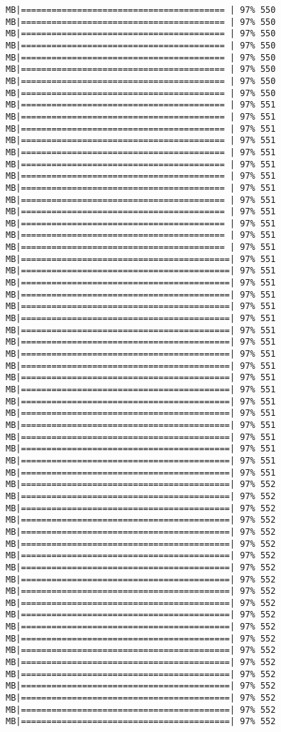 \documentclass[
]{article}
\begin{document}
\begin{verbatim}
MB|======================================== | 97% 550 MB|======================================== | 97% 550 MB|======================================== | 97% 550 MB|======================================== | 97% 550 MB|======================================== | 97% 550 MB|======================================== | 97% 550 MB|======================================== | 97% 550 MB|======================================== | 97% 550 MB|======================================== | 97% 551 MB|======================================== | 97% 551 MB|======================================== | 97% 551 MB|======================================== | 97% 551 MB|======================================== | 97% 551 MB|======================================== | 97% 551 MB|======================================== | 97% 551 MB|======================================== | 97% 551 MB|======================================== | 97% 551 MB|======================================== | 97% 551 MB|======================================== | 97% 551 MB|======================================== | 97% 551 MB|======================================== | 97% 551 MB|=========================================| 97% 551 MB|=========================================| 97% 551 MB|=========================================| 97% 551 MB|=========================================| 97% 551 MB|=========================================| 97% 551 MB|=========================================| 97% 551 MB|=========================================| 97% 551 MB|=========================================| 97% 551 MB|=========================================| 97% 551 MB|=========================================| 97% 551 MB|=========================================| 97% 551 MB|=========================================| 97% 551 MB|=========================================| 97% 551 MB|=========================================| 97% 551 MB|=========================================| 97% 551 MB|=========================================| 97% 551 MB|=========================================| 97% 551 MB|=========================================| 97% 551 MB|=========================================| 97% 551 MB|=========================================| 97% 552 MB|=========================================| 97% 552 MB|=========================================| 97% 552 MB|=========================================| 97% 552 MB|=========================================| 97% 552 MB|=========================================| 97% 552 MB|=========================================| 97% 552 MB|=========================================| 97% 552 MB|=========================================| 97% 552 MB|=========================================| 97% 552 MB|=========================================| 97% 552 MB|=========================================| 97% 552 MB|=========================================| 97% 552 MB|=========================================| 97% 552 MB|=========================================| 97% 552 MB|=========================================| 97% 552 MB|=========================================| 97% 552 MB|=========================================| 97% 552 MB|=========================================| 97% 552 MB|=========================================| 97% 552 MB|=========================================| 97% 552 
\end{verbatim}
\end{document}
